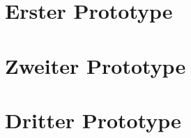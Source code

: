 \documentclass[a4paper,11pt]{article}
\begin{document}



\newpage
\renewcommand{\contentsname}{Inhaltsverzeichnis}
\tableofcontents
\clearpage


\renewcommand{\headrulewidth}{0pt}
\pagestyle{fancy} \fancyhf{} \rhead{\leftmark} \cfoot{\thepage}





\newpage
\renewcommand{\headrulewidth}{0.5pt}
\fancyhf{} \cfoot{\thepage}  %
\part{Erster Prototype}



%


\newpage
\fancyhf{} \cfoot{\thepage}  %
\part{Zweiter Prototype}



\newpage
\fancyhf{} \cfoot{\thepage}  %
\part{Dritter Prototype}



\newpage
\pagestyle{fancy} \fancyhf{} \rhead{\leftmark} \cfoot{\thepage} %
\end{document}
